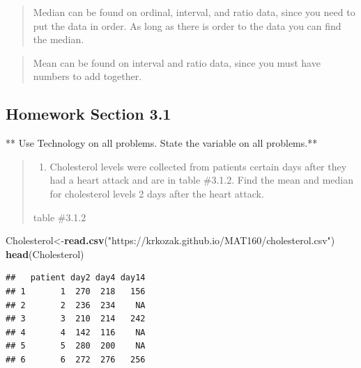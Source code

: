\documentclass[]{book}
\newenvironment{Shaded}{\begin{snugshade}}{\end{snugshade}}
\newcommand{\KeywordTok}[1]{\textcolor[rgb]{0.13,0.29,0.53}{\textbf{#1}}}
\newcommand{\NormalTok}[1]{#1}
\newcommand{\StringTok}[1]{\textcolor[rgb]{0.31,0.60,0.02}{#1}}
\providecommand{\tightlist}{%
  \setlength{\itemsep}{0pt}\setlength{\parskip}{0pt}}
\begin{document}
\begin{quote}
Median can be found on ordinal, interval, and ratio data, since you need to put the data in order. As long as there is order to the data you can find the median.
\end{quote}

\begin{quote}
Mean can be found on interval and ratio data, since you must have numbers to add together.
\end{quote}

\hypertarget{homework-section-3.1}{%
\subsection{Homework Section 3.1}\label{homework-section-3.1}}

** Use Technology on all problems. State the variable on all problems.**

\begin{quote}
\begin{enumerate}
\def\labelenumi{\arabic{enumi}.}
\tightlist
\item
  Cholesterol levels were collected from patients certain days after they had a heart attack and are in table \#3.1.2. Find the mean and median for cholesterol levels 2 days after the heart attack.
\end{enumerate}

table \#3.1.2
\end{quote}

\begin{Shaded}
\begin{Highlighting}[]
\NormalTok{Cholesterol<-}\KeywordTok{read.csv}\NormalTok{(}\StringTok{"https://krkozak.github.io/MAT160/cholesterol.csv"}\NormalTok{)}
\KeywordTok{head}\NormalTok{(Cholesterol)}
\end{Highlighting}
\end{Shaded}

\begin{verbatim}
##   patient day2 day4 day14
## 1       1  270  218   156
## 2       2  236  234    NA
## 3       3  210  214   242
## 4       4  142  116    NA
## 5       5  280  200    NA
## 6       6  272  276   256
\end{verbatim}
\end{document}
